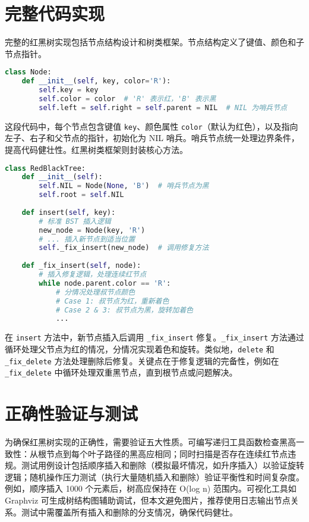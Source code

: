 \chapter{完整代码实现}
完整的红黑树实现包括节点结构设计和树类框架。节点结构定义了键值、颜色和子节点指针。\par
\begin{lstlisting}[language=python]
class Node:
    def __init__(self, key, color='R'):
        self.key = key
        self.color = color  # 'R' 表示红，'B' 表示黑
        self.left = self.right = self.parent = NIL  # NIL 为哨兵节点
\end{lstlisting}
这段代码中，每个节点包含键值 \texttt{key}、颜色属性 \texttt{color}（默认为红色），以及指向左子、右子和父节点的指针，初始化为 NIL 哨兵。哨兵节点统一处理边界条件，提高代码健壮性。红黑树类框架则封装核心方法。\par
\begin{lstlisting}[language=python]
class RedBlackTree:
    def __init__(self):
        self.NIL = Node(None, 'B')  # 哨兵节点为黑
        self.root = self.NIL
    
    def insert(self, key):
        # 标准 BST 插入逻辑
        new_node = Node(key, 'R')
        # ... 插入新节点到适当位置
        self._fix_insert(new_node)  # 调用修复方法
    
    def _fix_insert(self, node):
        # 插入修复逻辑，处理连续红节点
        while node.parent.color == 'R':
            # 分情况处理叔节点颜色
            # Case 1: 叔节点为红，重新着色
            # Case 2 & 3: 叔节点为黑，旋转加着色
            ...
\end{lstlisting}
在 \texttt{insert} 方法中，新节点插入后调用 \texttt{\_{}fix\_{}insert} 修复。\texttt{\_{}fix\_{}insert} 方法通过循环处理父节点为红的情况，分情况实现着色和旋转。类似地，\texttt{delete} 和 \texttt{\_{}fix\_{}delete} 方法处理删除后修复。关键点在于修复逻辑的完备性，例如在 \texttt{\_{}fix\_{}delete} 中循环处理双重黑节点，直到根节点或问题解决。\par
\chapter{正确性验证与测试}
为确保红黑树实现的正确性，需要验证五大性质。可编写递归工具函数检查黑高一致性：从根节点到每个叶子路径的黑高应相同；同时扫描是否存在连续红节点违规。测试用例设计包括顺序插入和删除（模拟最坏情况，如升序插入）以验证旋转逻辑；随机操作压力测试（执行大量随机插入和删除）验证平衡性和时间复杂度。例如，顺序插入 1000 个元素后，树高应保持在 O(log n) 范围内。可视化工具如 Graphviz 可生成树结构图辅助调试，但本文避免图片，推荐使用日志输出节点关系。测试中需覆盖所有插入和删除的分支情况，确保代码健壮。\par
